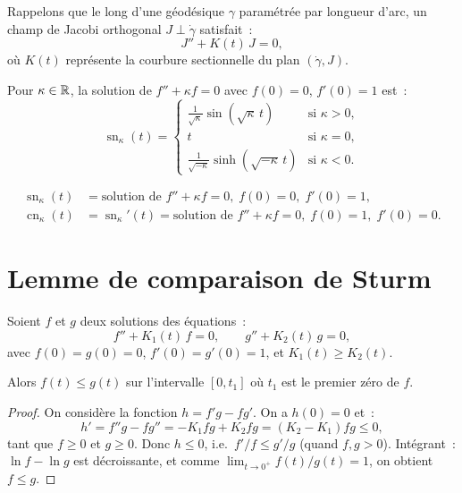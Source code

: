 Rappelons que le long d'une g\'eod\'esique $\gamma$ param\'etr\'ee par longueur d'arc,
un champ de Jacobi orthogonal $J \perp \dot\gamma$ satisfait~:
\[
    J'' + K(t)\, J = 0,
\]
o\`u $K(t)$ repr\'esente la courbure sectionnelle du plan $(\dot\gamma, J)$.

\begin{definition}
Pour $\kappa \in \mathbb{R}$, la solution de $f'' + \kappa f = 0$ avec $f(0) = 0$,
$f'(0) = 1$ est~:
\[
    \operatorname{sn}_\kappa(t) = \begin{cases}
    \frac{1}{\sqrt{\kappa}}\sin(\sqrt{\kappa}\, t) & \text{si } \kappa > 0, \\
    t & \text{si } \kappa = 0, \\
    \frac{1}{\sqrt{-\kappa}}\sinh(\sqrt{-\kappa}\, t) & \text{si } \kappa < 0.
    \end{cases}
\]
\end{definition}

\begin{formules}[title=\textbf{Fonctions de comparaison}]
\begin{align*}
    \operatorname{sn}_\kappa(t) &= \text{solution de } f'' + \kappa f = 0, \; f(0)=0, \; f'(0)=1, \\
    \operatorname{cn}_\kappa(t) &= \operatorname{sn}_\kappa'(t) = \text{solution de }
    f'' + \kappa f = 0, \; f(0)=1, \; f'(0)=0.
\end{align*}
\end{formules}

\section{Lemme de comparaison de Sturm}

\begin{lemme}[Sturm]
\label{lem:sturm}
Soient $f$ et $g$ deux solutions des \'equations~:
\[
    f'' + K_1(t)\, f = 0, \qquad g'' + K_2(t)\, g = 0,
\]
avec $f(0) = g(0) = 0$, $f'(0) = g'(0) = 1$, et $K_1(t) \geq K_2(t)$.

Alors $f(t) \leq g(t)$ sur l'intervalle $[0, t_1]$ o\`u $t_1$ est le premier z\'ero
de $f$.
\end{lemme}

\begin{proof}
On consid\`ere la fonction $h = f'g - fg'$. On a $h(0) = 0$ et~:
\[
    h' = f''g - fg'' = -K_1 fg + K_2 fg = (K_2 - K_1)fg \leq 0,
\]
tant que $f \geq 0$ et $g \geq 0$. Donc $h \leq 0$, i.e.\ $f'/f \leq g'/g$
(quand $f, g > 0$). Int\'egrant~: $\ln f - \ln g$ est d\'ecroissante, et comme
$\lim_{t \to 0^+} f(t)/g(t) = 1$, on obtient $f \leq g$.
\end{proof}

